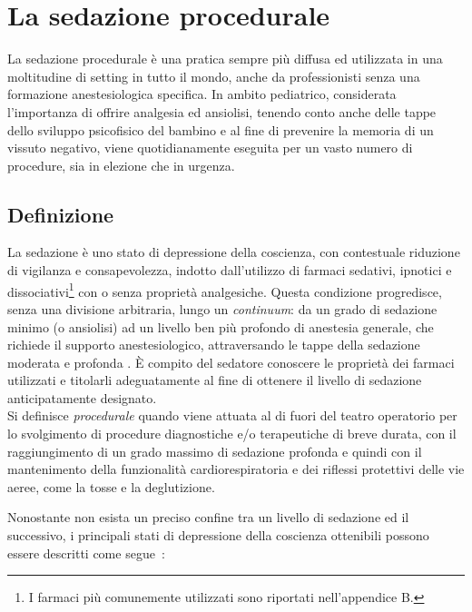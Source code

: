 \chapter{La sedazione procedurale}

La sedazione procedurale è una pratica sempre più diffusa ed utilizzata in una moltitudine di setting in tutto il mondo, anche da professionisti senza una formazione anestesiologica specifica. In ambito pediatrico, considerata l'importanza di offrire analgesia ed ansiolisi, tenendo conto anche delle tappe dello sviluppo psicofisico del bambino e al fine di prevenire la memoria di un vissuto negativo, viene quotidianamente eseguita per un vasto numero di procedure, sia in elezione che in urgenza. 

\section{Definizione}

La sedazione è uno stato di depressione della coscienza, con contestuale riduzione di vigilanza e consapevolezza, indotto dall'utilizzo di farmaci sedativi, ipnotici e dissociativi\footnote{I farmaci più comunemente utilizzati sono riportati nell'appendice B.} con o senza proprietà analgesiche. Questa condizione progredisce, senza una divisione arbitraria, lungo un \emph{continuum}: da un grado di sedazione minimo (o ansiolisi) ad un livello ben più profondo di anestesia generale, che richiede il supporto anestesiologico, attraversando le tappe della sedazione moderata e profonda \cite{Krauss2006}. \`E compito del sedatore conoscere le proprietà dei farmaci utilizzati e titolarli adeguatamente al fine di ottenere il livello di sedazione anticipatamente designato.  
\\Si definisce \emph{procedurale} quando viene attuata al di fuori del teatro operatorio per lo svolgimento di procedure diagnostiche e/o terapeutiche di breve durata, con il raggiungimento di un grado massimo di sedazione profonda e quindi con il mantenimento della funzionalità cardiorespiratoria e dei riflessi protettivi delle vie aeree, come la tosse e la deglutizione. 

Nonostante non esista un preciso confine tra un livello di sedazione ed il successivo, i principali stati di depressione della coscienza ottenibili possono essere descritti come segue~\cite{Statpearls, Berkenbosch2015}:

